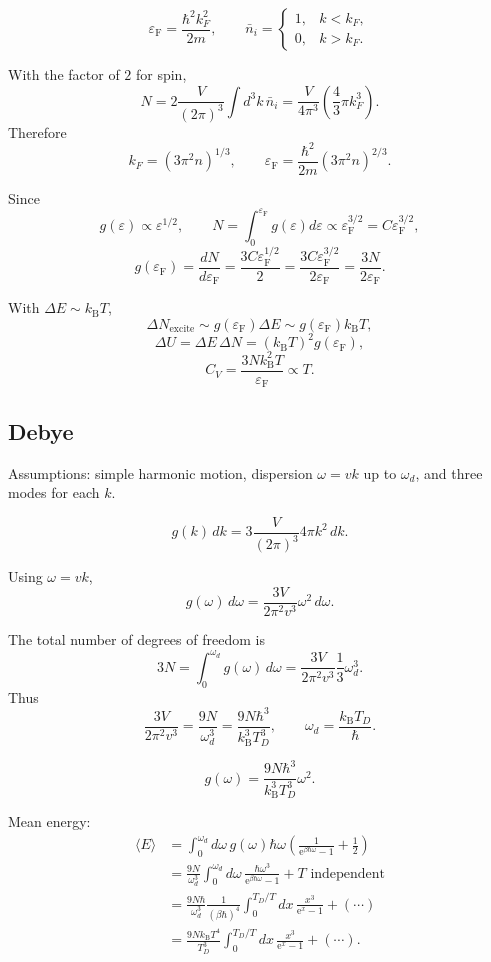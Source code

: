 \documentclass[11pt,a4paper]{article}
\newcommand{\ee}{\mathrm{e}}
\newcommand{\kB}{k_{\mathrm B}}
\newcommand{\epsF}{\varepsilon_{\mathrm F}}
\begin{document}
\[
  \epsF=\frac{\hbar^2 k_F^2}{2m},
  \qquad
  \bar n_i=
  \begin{cases}
  1, & k<k_F,\\
  0, & k>k_F.
  \end{cases}
\]

With the factor of $2$ for spin,
\[
  N
  =
  2\frac{V}{(2\pi)^3}\int d^3k\,\bar n_i
  =
  \frac{V}{4\pi^3}
  \left(\frac{4}{3}\pi k_F^3\right).
\]
Therefore
\[
  k_F=(3\pi^2 n)^{1/3},
  \qquad
  \epsF=\frac{\hbar^2}{2m}(3\pi^2 n)^{2/3}.
\]

Since
\[
  g(\varepsilon)\propto \varepsilon^{1/2},
  \qquad
  N=\int_0^{\epsF}g(\varepsilon)d\varepsilon
  \propto \epsF^{3/2}
  =
  C\epsF^{3/2},
\]
\[
  g(\epsF)
  =
  \frac{dN}{d\epsF}
  =
  \frac{3C\epsF^{1/2}}{2}
  =
  \frac{3C\epsF^{3/2}}{2\epsF}
  =
  \frac{3N}{2\epsF}.
\]

With $\Delta E\sim \kB T$,
\[
  \Delta N_{\mathrm{excite}}
  \sim g(\epsF)\Delta E
  \sim g(\epsF)\kB T,
\]
\[
  \Delta U=\Delta E\,\Delta N
  =
  (\kB T)^2 g(\epsF),
\]
\[
  C_V=\frac{3N\kB^2T}{\epsF}\propto T.
\]

\subsection{Debye}

Assumptions: simple harmonic motion, dispersion $\omega=vk$ up to
$\omega_d$, and three modes for each $k$.

\[
  g(k)\,dk
  =
  3\frac{V}{(2\pi)^3}4\pi k^2\,dk.
\]

Using $\omega=vk$,
\[
  g(\omega)\,d\omega
  =
  \frac{3V}{2\pi^2v^3}\omega^2\,d\omega.
\]

The total number of degrees of freedom is
\[
  3N=
  \int_0^{\omega_d}g(\omega)\,d\omega
  =
  \frac{3V}{2\pi^2v^3}\frac{1}{3}\omega_d^3.
\]
Thus
\[
  \frac{3V}{2\pi^2v^3}
  =
  \frac{9N}{\omega_d^3}
  =
  \frac{9N\hbar^3}{\kB^3T_D^3},
  \qquad
  \omega_d=\frac{\kB T_D}{\hbar}.
\]

\[
  g(\omega)=
  \frac{9N\hbar^3}{\kB^3T_D^3}\omega^2.
\]

Mean energy:
\[
\begin{aligned}
  \langle E\rangle
  &=
  \int_0^{\omega_d}d\omega\,g(\omega)\hbar\omega
  \left(\frac{1}{\ee^{\beta\hbar\omega}-1}+\frac12\right)\\
  &=
  \frac{9N}{\omega_d^3}
  \int_0^{\omega_d}d\omega\,
  \frac{\hbar\omega^3}{\ee^{\beta\hbar\omega}-1}
  +\text{$T$ independent}\\
  &=
  \frac{9N\hbar}{\omega_d^3}
  \frac{1}{(\beta\hbar)^4}
  \int_0^{T_D/T}dx\,\frac{x^3}{\ee^x-1}
  +(\cdots)\\
  &=
  \frac{9N\kB T^4}{T_D^3}
  \int_0^{T_D/T}dx\,\frac{x^3}{\ee^x-1}
  +(\cdots).
\end{aligned}
\]
\end{document}
